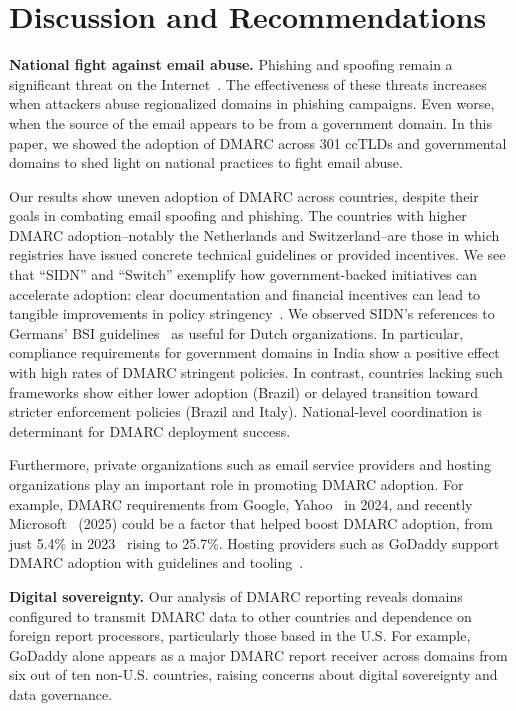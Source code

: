 \section{Discussion and Recommendations}
\label{sec:discussion}
\textbf{National fight against email abuse.}
Phishing and spoofing remain a significant threat on the Internet~\cite{FOCBSWarningPhishingMessages}.
The effectiveness of these threats increases when attackers abuse regionalized domains in phishing campaigns. Even worse, when the source of the email appears to be from a government domain.
In this paper, we showed the adoption of \gls{DMARC} across 301 \glspl{ccTLD} and governmental domains to shed light on national practices to fight email abuse.

Our results show uneven adoption of \gls{DMARC} across countries, despite their goals in combating email spoofing and phishing.
The countries with higher \gls{DMARC} adoption--notably the Netherlands and Switzerland--are those in which registries have issued concrete technical guidelines or provided incentives. We see that ``SIDN'' and ``Switch''  exemplify how government-backed initiatives can accelerate adoption: clear documentation and financial incentives can lead to tangible improvements in policy stringency~\cite{_Report2023Ch_}. We observed SIDN's references to Germans' BSI guidelines~\cite{_GermanysBSIPublishes_} as useful for Dutch organizations. In particular, compliance requirements for government domains in India show a positive effect with high rates of \gls{DMARC} stringent policies.
In contrast, countries lacking such frameworks show either lower adoption (\eg Brazil) or delayed transition toward stricter enforcement policies (\eg Brazil and Italy). National-level coordination is determinant for \gls{DMARC} deployment success.

Furthermore, private organizations such as email service providers and hosting organizations play an important role in promoting \gls{DMARC} adoption.
For example, DMARC requirements from Google, Yahoo~\cite{_NewGmailProtections_2023,_Yahoo_2023} in 2024, and recently Microsoft~\cite{_StrengtheningEmailEcosystem_} (2025) could be a factor that helped boost DMARC adoption, from just 5.4\% in 2023~\cite{hureau_spoofed} rising to 25.7\%.
Hosting providers such as GoDaddy support \gls{DMARC} adoption with guidelines and tooling~\cite{_GoDaddyWatDKIM_}.

\textbf{Digital sovereignty.}
Our analysis of \gls{DMARC} reporting reveals domains configured to transmit \gls{DMARC} data to other countries and dependence on foreign report processors, particularly those based in the U.S.
For example, GoDaddy alone appears as a major \gls{DMARC} report receiver across domains from six out of ten non-U.S. countries, raising concerns about digital sovereignty and data governance.

